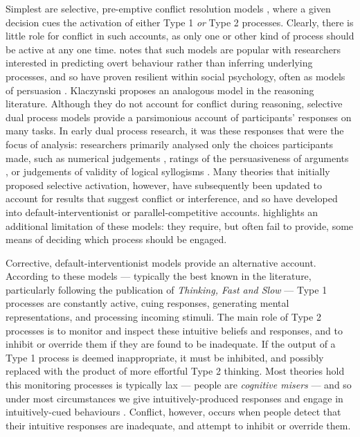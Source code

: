Simplest are selective, pre-emptive conflict resolution models
\citep{Chaiken1987, Petty1986, Klaczynski2000, Klaczynski2004},
where a given decision cues the activation of
either Type 1 \emph{or} Type 2 processes.
Clearly, there is little role for conflict in such accounts,
as only one or other kind of process should be active at any one time.
\citet{Gilbert1999} notes that such models are popular
with researchers interested in predicting overt behaviour
rather than inferring underlying processes,
and so have proven resilient within social psychology,
often as models of persuasion
\citep{Petty1986,Chaiken1987}.
Klaczynski \citetext{\citeyear{Klaczynski2000}; \citealp{Klaczynski2004}}
proposes an analogous model in the reasoning literature.
Although they do not account for conflict during reasoning,
selective dual process models provide
a parsimonious account of participants' responses on many tasks.
In early dual process research, it was these responses that were the focus of analysis:
researchers primarily analysed only the choices participants made,
such as numerical judgements \citep[e.g.][]{Tversky1981},
ratings of the persuasiveness of arguments \citep[e.g.][]{Chaiken1987},
or judgements of validity of logical syllogisms \citep[e.g.][]{Evans1983}.
Many theories that initially proposed selective activation,
however, have subsequently been updated to account for
results that suggest conflict or interference,
and so have developed into default-interventionist
or parallel-competitive accounts.
\citet{Evans2007a} highlights an additional limitation of these models:
they require, but often fail to provide, some means of deciding which process should be engaged.


Corrective, default-interventionist models
\citep{Evans2006, Kahneman2005,Kahneman2002}
provide an alternative account.
According to these models
--- typically the best known in the literature,
particularly following the publication of 
\emph{Thinking, Fast and Slow} ---
Type 1 processes are constantly active,
cuing responses, generating mental representations, and processing incoming stimuli.
The main role of Type 2 processes is to 
monitor and inspect these intuitive beliefs and responses,
and to inhibit or override them if they are found to be inadequate.
If the output of a Type 1 process is deemed inappropriate,
it must be inhibited, and possibly replaced
with the product of more effortful Type 2 thinking.
Most theories hold this monitoring processes is typically lax
--- people are \emph{cognitive misers} \citep{Fiske1991} ---
and so under most circumstances we give intuitively-produced responses
and engage in intuitively-cued behaviours
\citep{Tversky1974, Tversky1973, Kahneman1982, Kahneman1973,
  Kahneman2005, Kahneman2002, Stanovich1999, Gilovich2002}.
Conflict, however, occurs when people detect that
their intuitive responses are inadequate,
and attempt to inhibit or override them.


